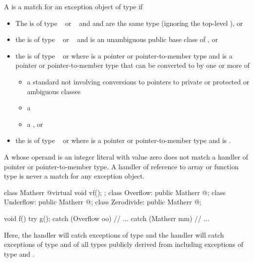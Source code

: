 \pnum
{}%
A
is a match for
an exception object
of type
if
\begin{itemize}
\item%
The  is of type \cv{}~ or
\cv{}~ and
 and 
are the same type (ignoring the top-level ), or
\item%
the  is of type \cv{}~ or
\cv{}~ and
 is an unambiguous public base class of , or
\item%
the  is of type \cv{}~ or 
where  is a pointer or pointer-to-member type and
 is a pointer or pointer-to-member type
that can be converted to  by one or more of
\begin{itemize}

\item%
a standard  not involving conversions
to pointers to private or protected or ambiguous classes
\item%
a 
\item%
a , or

\end{itemize}

\item
the  is of type \cv{}~ or  where  is a pointer or pointer-to-member type and  is .

\end{itemize}

\begin{note}
A
whose operand is an integer literal with value zero does not match a handler of
pointer or pointer-to-member type.
A handler of reference to array or function type
is never a match for any exception object.
\end{note}

\begin{example}
\begin{codeblock}
class Matherr { @\commentellip@ virtual void vf(); };
class Overflow: public Matherr { @\commentellip@ };
class Underflow: public Matherr { @\commentellip@ };
class Zerodivide: public Matherr { @\commentellip@ };

void f() {
  try {
    g();
  } catch (Overflow oo) {
    // ...
  } catch (Matherr mm) {
    // ...
  }
}
\end{codeblock}
Here, the
handler will catch exceptions of type
and the
handler will catch exceptions of type
and of all types publicly derived from
including exceptions of type
and
.
\end{example}

